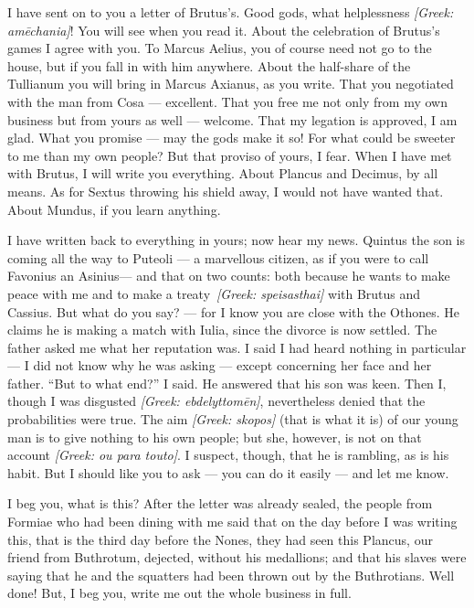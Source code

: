 

 I have sent on to you a letter of Brutus's. Good gods, what helplessness \textit{[Greek: am\=echania]}! You will see when you read it. About the celebration of Brutus's games I agree with you. To Marcus Aelius, you of course need not go to the house, but if you fall in with him anywhere. About the half-share of the Tullianum you will bring in Marcus Axianus, as you write. That you negotiated with the man from Cosa --- excellent. That you free me not only from my own business but from yours as well --- welcome. That my legation is approved, I am glad. What you promise --- may the gods make it so! For what could be sweeter to me than my own people? But that proviso of yours, I fear. When I have met with Brutus, I will write you everything. About Plancus and Decimus, by all means. As for Sextus throwing his shield away, I would not have wanted that. About Mundus, if you learn anything.

 I have written back to everything in yours; now hear my news. Quintus the son is coming all the way to Puteoli --- a marvellous citizen, as if you were to call \dag Favonius an Asinius\dag --- and that on two counts: \dag both because he wants to make peace with me and to make a treaty\dag\ \textit{[Greek: speisasthai]} with Brutus and Cassius. But what do you say? --- for I know you are close with the Othones. He claims he is making a match with Iulia, since the divorce is now settled. The father asked me what her reputation was. I said I had heard nothing in particular --- I did not know why he was asking --- except concerning her face and her father. ``But to what end?'' I said. He answered that his son was keen. Then I, though I was disgusted \textit{[Greek: ebdelyttom\=en]}, nevertheless denied that the probabilities were true. The aim \textit{[Greek: skopos]} (that is what it is) of our young man is to give nothing to his own people; but she, however, is not on that account \textit{[Greek: ou para touto]}. I suspect, though, that he is rambling, as is his habit. But I should like you to ask --- you can do it easily --- and let me know.

 I beg you, what is this? After the letter was already sealed, the people from Formiae who had been dining with me said that on the day before I was writing this, that is the third day before the Nones, they had seen this Plancus, our friend from Buthrotum, dejected, without his medallions; and that his slaves were saying that he and the squatters had been thrown out by the Buthrotians. Well done! But, I beg you, write me out the whole business in full.
